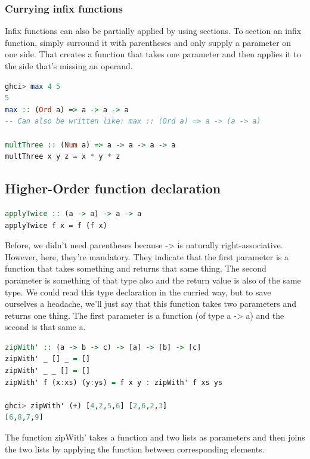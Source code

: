 \subsubsection{Currying infix functions}

Infix functions can also be partially applied by using sections. To section an infix function, simply surround it with parentheses and only supply a parameter on one side. That creates a function that takes one parameter and then applies it to the side that's missing an operand.

\begin{lstlisting}[language=Haskell]
ghci> max 4 5  
5 
max :: (Ord a) => a -> a -> a
-- Can also be written like: max :: (Ord a) => a -> (a -> a)

multThree :: (Num a) => a -> a -> a -> a  
multThree x y z = x * y * z
\end{lstlisting}

\clearpage
\subsection{Higher-Order function declaration}

\begin{lstlisting}[language=Haskell]
applyTwice :: (a -> a) -> a -> a  
applyTwice f x = f (f x)  
\end{lstlisting}

Before, we didn't need parentheses because -> is naturally right-associative. However, here, they're mandatory. They indicate that the first parameter is a function that takes something and returns that same thing. The second parameter is something of that type also and the return value is also of the same type. We could read this type declaration in the curried way, but to save ourselves a headache, we'll just say that this function takes two parameters and returns one thing. The first parameter is a function (of type a -> a) and the second is that same a.

\begin{lstlisting}[language=Haskell]
zipWith' :: (a -> b -> c) -> [a] -> [b] -> [c]  
zipWith' _ [] _ = []  
zipWith' _ _ [] = []  
zipWith' f (x:xs) (y:ys) = f x y : zipWith' f xs ys  

ghci> zipWith' (+) [4,2,5,6] [2,6,2,3]  
[6,8,7,9]  
\end{lstlisting}

The function zipWith' takes a function and two lists as parameters and then joins the two lists by applying the function between corresponding elements.

